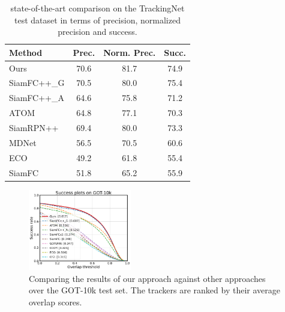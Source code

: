 \documentclass[journal]{IEEEtran}
\begin{document}
\begin{table}[t]
\renewcommand\arraystretch{0.8}
\centering
\caption{state-of-the-art comparison on the TrackingNet test dataset in terms of precision, normalized precision and success.}
\vspace{-0.2cm}
\begin{tabular}{l c c c}
\toprule
Method   &  Prec.   &  Norm. Prec. & Succ.  \\
\midrule
Ours  &  70.6&  81.7 &74.9 \\
SiamFC++\_G& 70.5 & 80.0 & 75.4 \\
SiamFC++\_A  & 64.6 & 75.8 & 71.2 \\
ATOM              & 64.8 & 77.1 & 70.3 \\
SiamRPN++&  69.4 & 80.0 &73.3 \\
MDNet	 &  56.5&  70.5 &60.6 \\
ECO	 &  49.2&  61.8 &55.4 \\
SiamFC	 &  51.8&  65.2 &55.9 \\
\bottomrule
\end{tabular}
\label{tabel:trackingnet}
\end{table}
\vspace{-0.2cm}

\begin{figure}[t]
    \centering
    \includegraphics[width=0.4\textwidth]{images/got10k/success_plot.png}
    \vspace{-0.3cm}
    \caption{Comparing the results of our approach against other approaches over the GOT-10k test set. The trackers are ranked by their average overlap scores.}
    \label{fig:got10k}
    \vspace{-5mm}
\end{figure}

\end{document}
